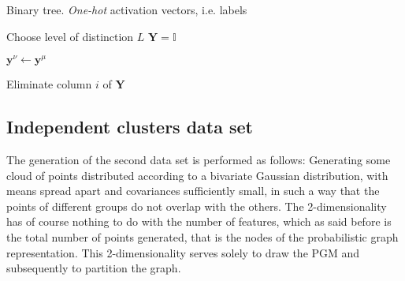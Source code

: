 \documentclass[a4paper,12pt]{article}
\begin{document}
\begin{algorithm}
	\begin{algorithmic}[1]
		\caption{Binary tree. \textit{One-hot} activation vectors, i.e. labels}
		
		\State Choose level of distinction $L$
		\State $\bm{Y} = \mathbb{I}$
		\vspace{2mm}
				\vspace{1mm}
				
					\vspace{1mm}
					\State $\bm{y}^{\nu} \leftarrow \bm{y}^{\mu}$
				\EndIf
			\EndFor
		\EndFor
		
		\vspace{2mm}
		
				\vspace{1mm}
				\State Eliminate column $i$ of $\bm{Y}$
			\EndIf
		\EndFor
		
		\label{alg:labelMatrix}
	\end{algorithmic}
\end{algorithm}


\subsection{Independent clusters data set}

The generation of the second data set is performed as follows: Generating some cloud of points distributed according to a bivariate Gaussian distribution, with means spread apart and covariances sufficiently small, in such a way that the points of different groups do not overlap with the others. The 2-dimensionality has of course nothing to do with the number of features, which as said before is the total number of points generated, that is the nodes of the probabilistic graph representation. This 2-dimensionality serves solely to draw the PGM and subsequently to partition the graph. 
\end{document}

